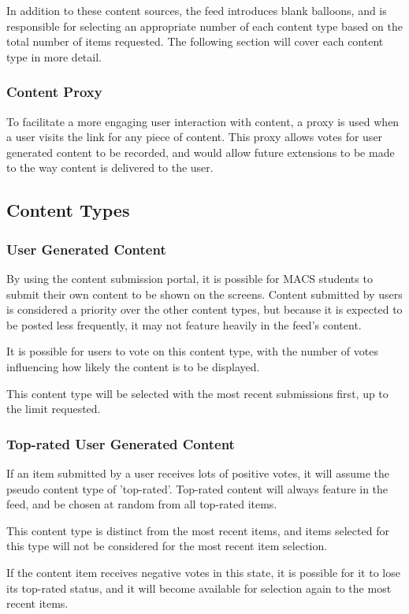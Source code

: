 In addition to these content sources, the feed introduces blank balloons, and is responsible for selecting an appropriate number of each content type based on the total number of items requested. The following section will cover each content type in more detail.

\subsubsection{Content Proxy}
To facilitate a more engaging user interaction with content, a proxy is used when a user visits the link for any piece of content. This proxy allows votes for user generated content to be recorded, and would allow future extensions to be made to the way content is delivered to the user.

\subsection{Content Types}

\subsubsection{User Generated Content}
By using the content submission portal, it is possible for MACS students to submit their own content to be shown on the screens. Content submitted by users is considered a priority over the other content types, but because it is expected to be posted less frequently, it may not feature heavily in the feed's content.

It is possible for users to vote on this content type, with the number of votes influencing how likely the content is to be displayed.

This content type will be selected with the most recent submissions first, up to the limit requested.

\subsubsection{Top-rated User Generated Content}
If an item submitted by a user receives lots of positive votes, it will assume the pseudo content type of 'top-rated'. Top-rated content will always feature in the feed, and be chosen at random from all top-rated items.

This content type is distinct from the most recent items, and items selected for this type will not be considered for the most recent item selection.

If the content item receives negative votes in this state, it is possible for it to lose its top-rated status, and it will become available for selection again to the most recent items.

